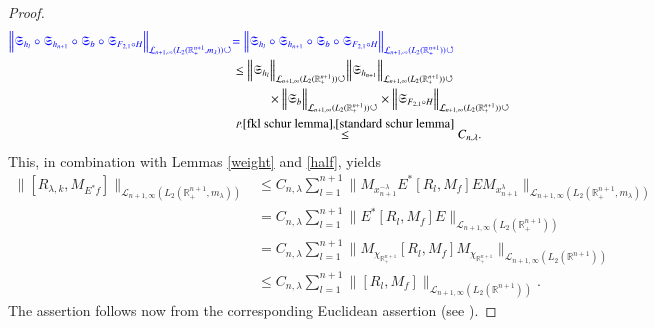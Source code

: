 \documentclass[12pt]{amsart}
\begin{document}
\begin{proof}
\begin{align*}
{\color{blue}\Big\|\mathfrak{S}_{h_l}\circ\mathfrak{S}_{h_{n+1}}\circ\mathfrak{S}_b\circ\mathfrak{S}_{F_{2,1}\circ H}\Big\|_{\mathcal{L}_{n+1,\infty}(L_2(\mathbb{R}^{n+1}_+,m_{\lambda}))\circlearrowleft}}
&{\color{blue}=\Big\|\mathfrak{S}_{h_l}\circ\mathfrak{S}_{h_{n+1}}\circ\mathfrak{S}_b\circ\mathfrak{S}_{F_{2,1}\circ H}\Big\|_{\mathcal{L}_{n+1,\infty}(L_2(\mathbb{R}^{n+1}_+))\circlearrowleft}}\\
&\leq \Big\|\mathfrak{S}_{h_l}\Big\|_{\mathcal{L}_{n+1,\infty}(L_2(\mathbb{R}^{n+1}_+))\circlearrowleft} \Big\|\mathfrak{S}_{h_{n+1}}\Big\|_{\mathcal{L}_{n+1,\infty}(L_2(\mathbb{R}^{n+1}_+))\circlearrowleft}\\
&\hspace{1.0cm}\times\Big\|\mathfrak{S}_b\Big\|_{\mathcal{L}_{n+1,\infty}(L_2(\mathbb{R}^{n+1}_+))\circlearrowleft}\times \Big\|\mathfrak{S}_{F_{2,1}\circ H}\Big\|_{\mathcal{L}_{n+1,\infty}(L_2(\mathbb{R}^{n+1}_+))\circlearrowleft}\\
&\stackrel{P.\ref{fkl schur lemma},\ref{standard schur lemma}}{\leq}{C_{n,\lambda}}.
\end{align*}
This, in combination with Lemmas \ref{weight} and \ref{half}, yields
\begin{align*}
\|[R_{\lambda,k},M_{E^{\ast}f}]\|_{\mathcal{L}_{n+1,\infty}(L_2(\mathbb{R}^{n+1}_+,m_{\lambda}))}
&\leq C_{n,\lambda}\sum_{l=1}^{n+1}\Big\|M_{x_{n+1}^{-\lambda}} E^{\ast}[R_l,M_f]E M_{x_{n+1}^{\lambda}}\Big\|_{\mathcal{L}_{n+1,\infty}(L_2(\mathbb{R}^{n+1}_+,m_{\lambda}))}\\
&=C_{n,\lambda}\sum_{l=1}^{n+1}\Big\|E^{\ast}[R_l,M_f]E\Big\|_{\mathcal{L}_{n+1,\infty}(L_2(\mathbb{R}^{n+1}_+))}\\
&=C_{n,\lambda} \sum_{l=1}^{n+1}\Big\|M_{\chi_{\mathbb{R}_+^{n+1}}}[R_l,M_f]M_{\chi_{\mathbb{R}_+^{n+1}}}\Big\|_{\mathcal{L}_{n+1,\infty}(L_2(\mathbb{R}^{n+1}))}\\
&\leq C_{n,\lambda} \sum_{l=1}^{n+1}\Big\|[R_l,M_f]\Big\|_{\mathcal{L}_{n+1,\infty}(L_2(\mathbb{R}^{n+1}))}.
\end{align*}
The assertion follows now from the corresponding Euclidean assertion (see \cite[Theorem 1]{LMSZ}).
\end{proof}
\end{document}
